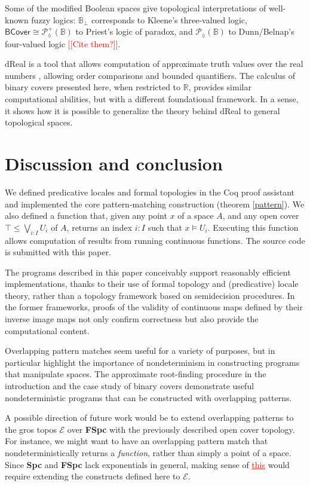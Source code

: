 \documentclass[conference]{IEEEtran}
\newcommand{\PLower}{\mathcal{P}_\lozenge}
\newcommand{\R}{\mathbb{R}}
\newcommand{\bool}{\mathbb{B}}
\newcommand{\BCover}{\mathsf{BCover}}
\newcommand{\note}[1]{\textcolor{red}{[[{#1}]]}}
\newcommand{\grammar}[1]{\textcolor{red}{\underline{#1}}}
\begin{document}
Some of the modified Boolean spaces give topological interpretations of well-known fuzzy logics: $\bool_\bot$ corresponds to Kleene's three-valued logic, $\BCover \cong \PLower^+(\bool)$ to Priest's logic of paradox, and $\PLower(\bool)$ to Dunn/Belnap's four-valued logic \note{Cite them?}.

dReal is a tool that allows computation of approximate truth values over the real numbers \cite{dReal}, allowing order comparisons and bounded quantifiers. The calculus of binary covers presented here, when restricted to $\R$, provides similar computational abilities, but with a different foundational framework. In a sense, it shows how it is possible to generalize the theory behind dReal to general topological spaces.

\section{Discussion and conclusion}

We defined predicative locales and formal topologies in the Coq proof assistant and implemented the core pattern-matching construction (theorem \ref{pattern}). We also defined a function that, given any point $x$ of a space $A$, and any open cover $\top \le \bigvee_{i : I} U_i$ of $A$, returns an index $i : I$ such that $x \models U_i$. Executing this function allows computation of results from running continuous functions. The source code is submitted with this paper.

The programs described in this paper conceivably support reasonably efficient implementations, thanks to their use of formal topology and (predicative) locale theory, rather than a topology framework based on semidecision procedures. In the former frameworks, proofs of the validity of continuous maps defined by their inverse image maps not only confirm correctness but also provide the computational content.

Overlapping pattern matches seem useful for a variety of purposes, but in particular highlight the  importance of nondeterminism in constructing programs that manipulate spaces. The approximate root-finding procedure in the introduction and the case study of binary covers demonstrate useful nondeterministic programs that can be constructed with overlapping patterns.

A possible direction of future work would be to extend overlapping patterns to the gros topos $\mathcal{E}$ over \textbf{FSpc} with the previously described open cover topology. For instance, we might want to have an overlapping pattern match that nondeterministically returns a \emph{function}, rather than simply a point of a space. Since \textbf{Spc} and \textbf{FSpc} lack exponentials in general, making sense of \grammar{this} would require extending the constructs defined here to $\mathcal{E}$.
\end{document}
